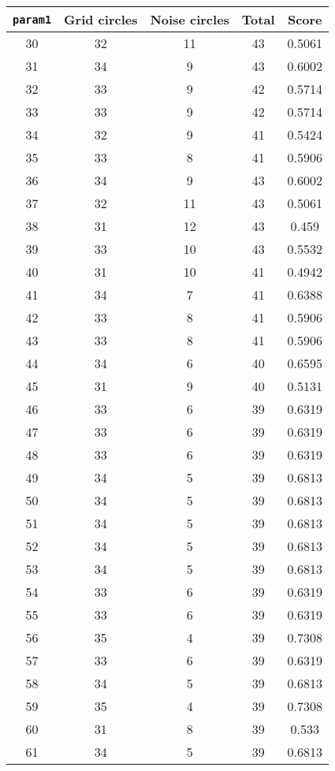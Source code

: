 \documentclass[letterpaper, 12pt]{article}
\begin{document}
\begin{longtable}{|c|c|c|c|c|}
\hline
\textbf{\texttt{param1}} & \textbf{Grid circles} & \textbf{Noise circles} & \textbf{Total} & \textbf{Score} \\
\hline
30 & 32 & 11 & 43 & 0.5061 \\
\hline
31 & 34 & 9 & 43 & 0.6002 \\
\hline
32 & 33 & 9 & 42 & 0.5714 \\
\hline
33 & 33 & 9 & 42 & 0.5714 \\
\hline
34 & 32 & 9 & 41 & 0.5424 \\
\hline
35 & 33 & 8 & 41 & 0.5906 \\
\hline
36 & 34 & 9 & 43 & 0.6002 \\
\hline
37 & 32 & 11 & 43 & 0.5061 \\
\hline
38 & 31 & 12 & 43 & 0.459 \\
\hline
39 & 33 & 10 & 43 & 0.5532 \\
\hline
40 & 31 & 10 & 41 & 0.4942 \\
\hline
41 & 34 & 7 & 41 & 0.6388 \\
\hline
42 & 33 & 8 & 41 & 0.5906 \\
\hline
43 & 33 & 8 & 41 & 0.5906 \\
\hline
44 & 34 & 6 & 40 & 0.6595 \\
\hline
45 & 31 & 9 & 40 & 0.5131 \\
\hline
46 & 33 & 6 & 39 & 0.6319 \\
\hline
47 & 33 & 6 & 39 & 0.6319 \\
\hline
48 & 33 & 6 & 39 & 0.6319 \\
\hline
49 & 34 & 5 & 39 & 0.6813 \\
\hline
50 & 34 & 5 & 39 & 0.6813 \\
\hline
51 & 34 & 5 & 39 & 0.6813 \\
\hline
52 & 34 & 5 & 39 & 0.6813 \\
\hline
53 & 34 & 5 & 39 & 0.6813 \\
\hline
54 & 33 & 6 & 39 & 0.6319 \\
\hline
55 & 33 & 6 & 39 & 0.6319 \\
\hline
56 & 35 & 4 & 39 & 0.7308 \\
\hline
57 & 33 & 6 & 39 & 0.6319 \\
\hline
58 & 34 & 5 & 39 & 0.6813 \\
\hline
59 & 35 & 4 & 39 & 0.7308 \\
\hline
60 & 31 & 8 & 39 & 0.533 \\
\hline
61 & 34 & 5 & 39 & 0.6813 \\

\end{longtable}
\end{document}
